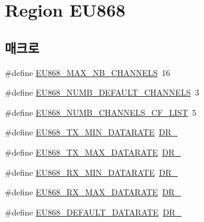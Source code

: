 \hypertarget{group___r_e_g_i_o_n_e_u868}{}\section{Region E\+U868}
\label{group___r_e_g_i_o_n_e_u868}
\subsection*{매크로}
\begin{DoxyCompactItemize}
\item 
\#define \mbox{\hyperlink{group___r_e_g_i_o_n_e_u868_gaf94c3090ac541fec3c97b2146702d252}{E\+U868\+\_\+\+M\+A\+X\+\_\+\+N\+B\+\_\+\+C\+H\+A\+N\+N\+E\+LS}}~16
\item 
\#define \mbox{\hyperlink{group___r_e_g_i_o_n_e_u868_ga43b13bdefab43add062b907facaef8ba}{E\+U868\+\_\+\+N\+U\+M\+B\+\_\+\+D\+E\+F\+A\+U\+L\+T\+\_\+\+C\+H\+A\+N\+N\+E\+LS}}~3
\item 
\#define \mbox{\hyperlink{group___r_e_g_i_o_n_e_u868_gad3cd171e0308aa36be7231a3fcba36b8}{E\+U868\+\_\+\+N\+U\+M\+B\+\_\+\+C\+H\+A\+N\+N\+E\+L\+S\+\_\+\+C\+F\+\_\+\+L\+I\+ST}}~5
\item 
\#define \mbox{\hyperlink{group___r_e_g_i_o_n_e_u868_ga2df2a8fc7db7e674c3e58de0dd1c90a4}{E\+U868\+\_\+\+T\+X\+\_\+\+M\+I\+N\+\_\+\+D\+A\+T\+A\+R\+A\+TE}}~\mbox{\hyperlink{group___r_e_g_i_o_n_ga6c4ef966b4f3d5eb7597b087f2b97095}{D\+R\+\_}}
\item 
\#define \mbox{\hyperlink{group___r_e_g_i_o_n_e_u868_ga689495f3ecc7047ff636ec85b3b80ee3}{E\+U868\+\_\+\+T\+X\+\_\+\+M\+A\+X\+\_\+\+D\+A\+T\+A\+R\+A\+TE}}~\mbox{\hyperlink{group___r_e_g_i_o_n_ga3a06805baf4f00911a3a5d3dbadebf61}{D\+R\+\_}}
\item 
\#define \mbox{\hyperlink{group___r_e_g_i_o_n_e_u868_gaa1bdf9b64650b847961424f9098278fc}{E\+U868\+\_\+\+R\+X\+\_\+\+M\+I\+N\+\_\+\+D\+A\+T\+A\+R\+A\+TE}}~\mbox{\hyperlink{group___r_e_g_i_o_n_ga6c4ef966b4f3d5eb7597b087f2b97095}{D\+R\+\_}}
\item 
\#define \mbox{\hyperlink{group___r_e_g_i_o_n_e_u868_ga84a09a53f67ea79b84d27a56e51679ab}{E\+U868\+\_\+\+R\+X\+\_\+\+M\+A\+X\+\_\+\+D\+A\+T\+A\+R\+A\+TE}}~\mbox{\hyperlink{group___r_e_g_i_o_n_ga3a06805baf4f00911a3a5d3dbadebf61}{D\+R\+\_}}
\item 
\#define \mbox{\hyperlink{group___r_e_g_i_o_n_e_u868_ga4053f96ad333ad07d4584f7213e294fa}{E\+U868\+\_\+\+D\+E\+F\+A\+U\+L\+T\+\_\+\+D\+A\+T\+A\+R\+A\+TE}}~\mbox{\hyperlink{group___r_e_g_i_o_n_ga6c4ef966b4f3d5eb7597b087f2b97095}{D\+R\+\_}}

\end{DoxyCompactItemize}
